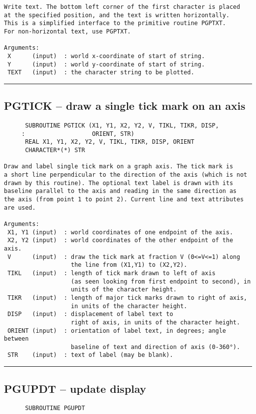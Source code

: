 {\begin{verbatim}
Write text. The bottom left corner of the first character is placed
at the specified position, and the text is written horizontally.
This is a simplified interface to the primitive routine PGPTXT.
For non-horizontal text, use PGPTXT.

Arguments:
 X      (input)  : world x-coordinate of start of string.
 Y      (input)  : world y-coordinate of start of string.
 TEXT   (input)  : the character string to be plotted.
\end{verbatim}
\hrule


\subsection*{PGTICK -- draw a single tick mark on an axis }
\begin{verbatim}
      SUBROUTINE PGTICK (X1, Y1, X2, Y2, V, TIKL, TIKR, DISP, 
     :                   ORIENT, STR)
      REAL X1, Y1, X2, Y2, V, TIKL, TIKR, DISP, ORIENT
      CHARACTER*(*) STR

Draw and label single tick mark on a graph axis. The tick mark is
a short line perpendicular to the direction of the axis (which is not
drawn by this routine). The optional text label is drawn with its
baseline parallel to the axis and reading in the same direction as
the axis (from point 1 to point 2). Current line and text attributes
are used.

Arguments:
 X1, Y1 (input)  : world coordinates of one endpoint of the axis.
 X2, Y2 (input)  : world coordinates of the other endpoint of the axis.
 V      (input)  : draw the tick mark at fraction V (0<=V<=1) along
                   the line from (X1,Y1) to (X2,Y2).
 TIKL   (input)  : length of tick mark drawn to left of axis
                   (as seen looking from first endpoint to second), in
                   units of the character height.
 TIKR   (input)  : length of major tick marks drawn to right of axis,
                   in units of the character height.
 DISP   (input)  : displacement of label text to
                   right of axis, in units of the character height.
 ORIENT (input)  : orientation of label text, in degrees; angle between
                   baseline of text and direction of axis (0-360°).
 STR    (input)  : text of label (may be blank).
\end{verbatim}
\hrule


\subsection*{PGUPDT -- update display }
\begin{verbatim}
      SUBROUTINE PGUPDT


\end{verbatim}}
